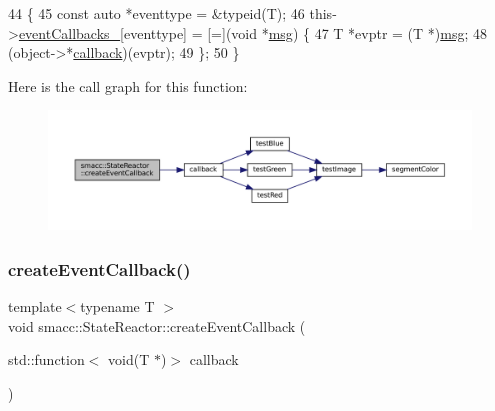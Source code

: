 \begin{DoxyCode}
44 \{
45     \textcolor{keyword}{const} \textcolor{keyword}{auto} *eventtype = &\textcolor{keyword}{typeid}(T);
46     this->\hyperlink{classsmacc_1_1StateReactor_a63cce05c412f3699cc1b15af9aeaf8af}{eventCallbacks\_}[eventtype] = [=](\textcolor{keywordtype}{void} *\hyperlink{namespacebattery__monitor__node_ab1920c64448816edd4064e494275fdff}{msg}) \{
47         T *evptr = (T *)\hyperlink{namespacebattery__monitor__node_ab1920c64448816edd4064e494275fdff}{msg};
48         (\textcolor{keywordtype}{object}->*\hyperlink{servers_2opencv__perception__node_2opencv__perception__node_8cpp_a050e697bd654facce10ea3f6549669b3}{callback})(evptr);
49     \};
50 \}
\end{DoxyCode}
Here is the call graph for this function\+:
\nopagebreak
\begin{figure}[H]
\begin{center}
\leavevmode
\includegraphics[width=350pt]{classsmacc_1_1StateReactor_a68482e08f6449694a0bcda843b14b376_cgraph}
\end{center}
\end{figure}
\mbox{\label{classsmacc_1_1StateReactor_ac6b3a604009e5a68123aed27e70cf2be}} 
\subsubsection{\texorpdfstring{create\+Event\+Callback()}{createEventCallback()}\hspace{0.1cm}{\footnotesize\ttfamily [2/2]}}
{\footnotesize\ttfamily template$<$typename T $>$ \\
void smacc\+::\+State\+Reactor\+::create\+Event\+Callback (\begin{DoxyParamCaption}\item[{std\+::function$<$ void(T $\ast$)$>$}]{callback }\end{DoxyParamCaption})}



